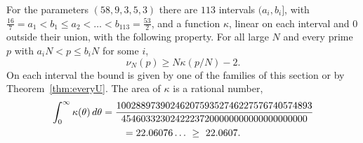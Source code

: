 \begin{theorem}\label{thm:profile-D}
For the parameters $(58,9,3,5,3)$ there are $113$ intervals $(a_i,b_i]$, with
$\frac{16}7=a_1<b_1\le a_2<\dots<b_{113}=\frac{53}2$, and a function $\kappa$, linear on each interval and $0$
outside their union, with the following property. For all large $N$ and every prime $p$ with
$a_iN<p\le b_iN$ for some $i$,
\[
 \nu_N(p)\ge N\kappa(p/N)-2 .
\]
On each interval the bound is given by one of the families of this section or by
Theorem~\ref{thm:everyU}. The area of $\kappa$ is a rational number,
\begin{multline*}
 \int_0^\infty\kappa(\theta)\,d\theta=\frac{1002889739024620759352746227576740574893}{45460332302422237200000000000000000000}\\
 =22.06076\ldots\ \ge\ 22.0607 .
\end{multline*}
\end{theorem}

